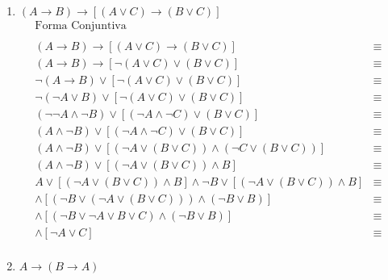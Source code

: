 \begin{enumerate}
\begin{enumerate}
				\item $(A\rightarrow B)\rightarrow[(A\lor C)\rightarrow (B\lor C)]$ 
					\[
						\begin{array}{lcl}
							\text{Forma Conjuntiva} &  & \\
							& & \\
							(A\rightarrow B)\rightarrow[(A\lor C)\rightarrow (B\lor C)] & \equiv & \\
							
							(A\rightarrow B)\rightarrow[\neg(A\lor C)\lor (B\lor C)] & \equiv & \\
							
							
							\neg(A\rightarrow B)\lor[\neg(A\lor C)\lor (B\lor C)] & \equiv & \\
							
							\neg(\neg A\lor B)\lor[\neg(A\lor C)\lor (B\lor C)] & \equiv & \\
							
							(\neg \neg A \land \neg B) \lor [(\neg A \land \neg C) \lor (B \lor C)] & \equiv & \\
							
							(A \land \neg B) \lor [(\neg A \land \neg C) \lor (B \lor C)] & \equiv & \\
							
							(A \land \neg B) \lor [(\neg A \lor (B \lor C)) \land (\neg C \lor (B \lor C))] & \equiv & \\
							(A \land \neg B) \lor [(\neg A \lor (B \lor C)) \land B] & \equiv & \\
							A \lor [( \neg A \lor (B \lor C)) \land B] \land  \neg B \lor [(\neg A \lor (B \lor C)) \land B] & \equiv & \\
							
						    [(A \lor( \neg A \lor (B \lor C))) \land (A \lor B)] \land [(\neg B \lor (\neg A \lor (B \lor C))) \land (\neg B \lor B)] & \equiv & \\
								
							[(A \lor \neg A \lor B \lor C) \land (A \lor B)] \land [(\neg B \lor \neg A \lor B \lor C) \land (\neg B \lor B)] & \equiv & \\
							
							[( B \lor C) \land (A \lor B)] \land [ \neg A  \lor C] & \equiv & \\

						\end{array}
					\]
				
				
				\item $A\rightarrow(B\rightarrow A)$ 
					\[
						\begin{array}{lcl}
							

\end{array}\]
\end{enumerate}
\end{enumerate}
